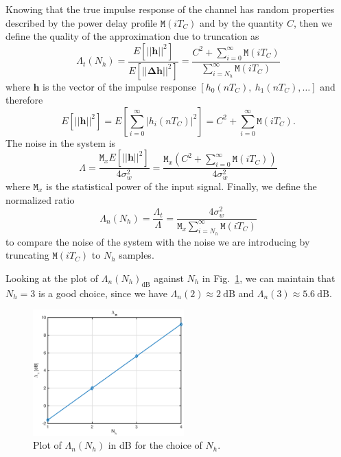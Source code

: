 \documentclass[10pt]{article}
\newcommand{\M} {\mathtt{M}}
\newcommand{\dB} {\mathrm{dB}}
\begin{document}
Knowing that the true impulse response of the channel has random properties described by the power delay profile $\M(iT_C)$ and by the quantity $C$, then we define the quality of the approximation due to truncation as
\begin{equation}
\Lambda_t(N_h) = \frac{E[||\mathbf{h}||^2]}{E[||\mathbf{\Delta h}||^2]} = \frac{C^2 + \sum_{i=0}^{\infty} \M(iT_C)}{\sum_{i=N_h}^{\infty} \M(iT_C)}
\end{equation}
where $\mathbf{h}$ is the vector of the impulse response $[h_0(nT_C),~h_1(nT_C),\ldots]$ and therefore
\begin{equation}
E[||\mathbf{h}||^2] = E[\sum_{i=0}^{\infty} |h_i(nT_C)|^2] = C^2 + \sum_{i=0}^{\infty} \M(iT_C).
\end{equation}
The noise in the system is
\begin{equation}
\Lambda = \frac{\M_x E[||\mathbf{h}||^2]}{4 \sigma_w^2} = \frac{\M_x (C^2 + \sum_{i=0}^{\infty} \M(iT_C))}{4 \sigma_w^2}
\end{equation}
where $\M_x$ is the statistical power of the input signal. Finally, we define the normalized ratio
\begin{equation}
\Lambda_n (N_h) = \frac{\Lambda_t}{\Lambda} = \frac{4 \sigma_w^2}{\M_x \sum_{i=N_h}^{\infty} \M(iT_C)}
\end{equation}
to compare the noise of the system with the noise we are introducing by truncating $\M(iT_C)$ to $N_h$ samples.

Looking at the plot of $\Lambda_n (N_h)_{\dB}$ against $N_h$ in Fig.~\ref{fig:p01_lambda_n}, we can maintain that $N_h = 3$ is a good choice, since we have $\Lambda_n(2) \approx 2~\dB$ and $\Lambda_n(3) \approx 5.6~\dB$.

\begin{figure}[ht]
	\centering
	\includegraphics[width=0.52\textwidth]{p01_lambda_n}
	\caption{Plot of $\Lambda_n (N_h)$ in dB for the choice of $N_h$.}
    \label{fig:p01_lambda_n}
\end{figure}
\end{document}
